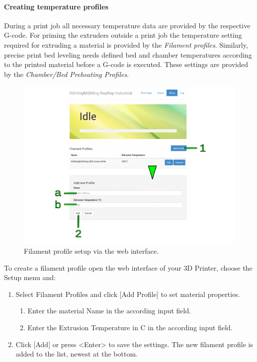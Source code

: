 \paragraph{Creating temperature profiles}

During a print job all necessary temperature data are provided by the respective G-code. For priming the extruders outside a print job the temperature setting required for extruding a material is provided by the \emph{Filament profiles}.
Similarly, precise print bed leveling needs defined bed and chamber temperatures according to the printed material before a G-code is executed. These settings are provided by the \emph{Chamber/Bed Preheating Profiles}. 

\begin{figure}[H]
  \centering
  \includegraphics[width=.7\linewidth]{./img/wif_setup_addfilamentprofile.png}
  \caption{Filament profile setup via the web interface.}
\end{figure}

To create a filament profile open the web interface of your 3D Printer, choose the Setup menu and:

\begin{enumerate}
  \item Select Filament Profiles and click [Add Profile] to set material properties.
    \begin{enumerate}
      \item Enter the material Name in the according input field.
      \item Enter the Extrusion Temperature in \degree C in the according input field.
    \end{enumerate}
  \item Click [Add] or press <Enter> to save the settings. The new filament profile 
        is added to the list, newest at the bottom.
\end{enumerate}

